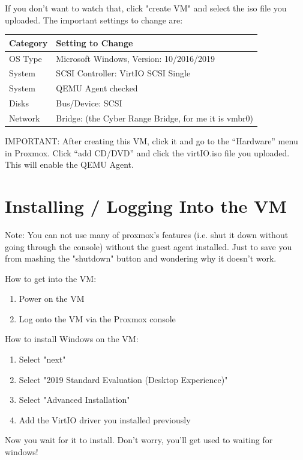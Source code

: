 \documentclass{article}
\begin{document}
\noindent If you don't want to watch that, click "create VM" and select the iso file you uploaded.
\noindent The important settings to change are:
\vspace{1cm}

\begin{tabular}{l l}
    Category & Setting to Change\\
    \hline
    OS Type & Microsoft Windows, Version: 10/2016/2019 \\
    System & SCSI Controller: VirtIO SCSI Single \\
    System & QEMU Agent checked \\
    Disks & Bus/Device: SCSI \\
    Network & Bridge: (the Cyber Range Bridge, for me it is vmbr0)
  \end{tabular}

IMPORTANT: After creating this VM, click it and go to the “Hardware” menu in Proxmox. Click “add CD/DVD” and click the virtIO.iso file you uploaded. This will enable the QEMU Agent.

\section{Installing / Logging Into the VM}
Note: You can not use many of proxmox's features (i.e. shut it down without going through the console) without the guest agent installed. Just to save you from mashing the "shutdown" button and wondering why it doesn't work. 

\noindent How to get into the VM:

\begin{enumerate}
    \item Power on the VM
    \item Log onto the VM via the Proxmox console
\end{enumerate}

\noindent How to install Windows on the VM:

\begin{enumerate}
    \item Select "next"
    \item Select "2019 Standard Evaluation (Desktop Experience)"
    \item Select "Advanced Installation"
    \item Add the VirtIO driver you installed previously
\end{enumerate}

Now you wait for it to install. Don't worry, you'll get used to waiting for windows!
\end{document}
